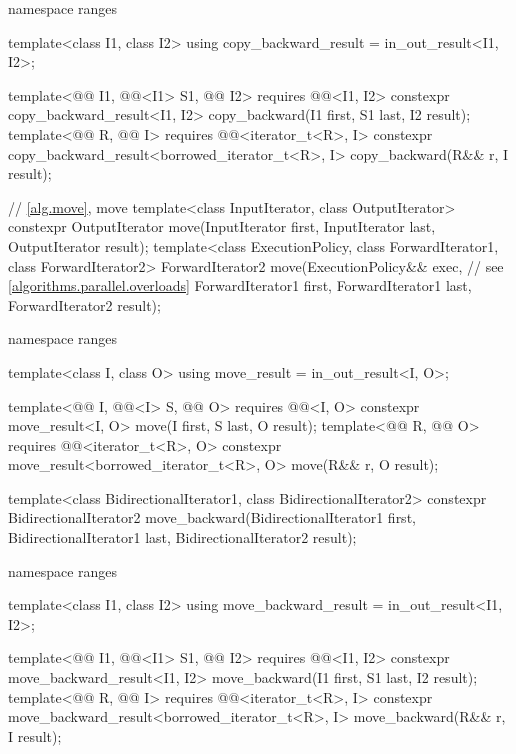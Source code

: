 \begin{codeblock}
{  namespace ranges {
    template<class I1, class I2>
      using copy_backward_result = in_out_result<I1, I2>;

    template<@@ I1, @@<I1> S1, @@ I2>
      requires @@<I1, I2>
      constexpr copy_backward_result<I1, I2>
        copy_backward(I1 first, S1 last, I2 result);
    template<@@ R, @@ I>
      requires @@<iterator_t<R>, I>
      constexpr copy_backward_result<borrowed_iterator_t<R>, I>
        copy_backward(R&& r, I result);
  }

  // \ref{alg.move}, move
  template<class InputIterator, class OutputIterator>
    constexpr OutputIterator move(InputIterator first, InputIterator last,
                                  OutputIterator result);
  template<class ExecutionPolicy, class ForwardIterator1,
           class ForwardIterator2>
    ForwardIterator2 move(ExecutionPolicy&& exec,               // see \ref{algorithms.parallel.overloads}
                          ForwardIterator1 first, ForwardIterator1 last,
                          ForwardIterator2 result);

  namespace ranges {
    template<class I, class O>
      using move_result = in_out_result<I, O>;

    template<@@ I, @@<I> S, @@ O>
      requires @@<I, O>
      constexpr move_result<I, O>
        move(I first, S last, O result);
    template<@@ R, @@ O>
      requires @@<iterator_t<R>, O>
      constexpr move_result<borrowed_iterator_t<R>, O>
        move(R&& r, O result);
  }

  template<class BidirectionalIterator1, class BidirectionalIterator2>
    constexpr BidirectionalIterator2
      move_backward(BidirectionalIterator1 first, BidirectionalIterator1 last,
                    BidirectionalIterator2 result);

  namespace ranges {
    template<class I1, class I2>
      using move_backward_result = in_out_result<I1, I2>;

    template<@@ I1, @@<I1> S1, @@ I2>
      requires @@<I1, I2>
      constexpr move_backward_result<I1, I2>
        move_backward(I1 first, S1 last, I2 result);
    template<@@ R, @@ I>
      requires @@<iterator_t<R>, I>
      constexpr move_backward_result<borrowed_iterator_t<R>, I>
        move_backward(R&& r, I result);
  }

}
\end{codeblock}
